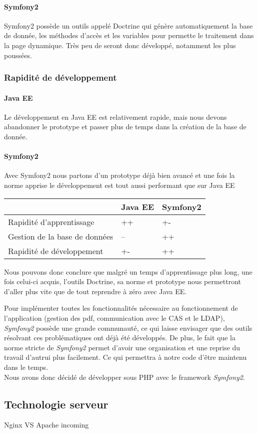 \paragraph{Symfony2}
Symfony2 possède un outils appelé Doctrine qui génère automatiquement la base de donnée, les méthodes d'accès et les variables pour permette le traitement dans la page dynamique. Très peu de seront donc développé, notamment les plus poussées.

\subsubsection{Rapidité de développement}
\paragraph{Java EE}
Le développement en Java EE est relativement rapide, mais nous devons abandonner le prototype et passer plus de temps dans la création de la base de donnée.

\paragraph{Symfony2}
Avec Symfony2 nous partons d'un prototype déjà bien avancé et une fois la norme apprise le développement est tout aussi performant que sur Java EE


\begin{tabular}{|m{125pt}|m{150pt}|m{150pt}|}
	\hline
	\null & \textbf{Java EE} & \textbf{Symfony2} \\
	\hline
	Rapidité d'apprentissage & ++ & +-\\
	\hline
	Gestion de la base de données & -- & ++\\
	\hline
	Rapidité de développement & +- & ++ \\
	\hline
\end{tabular} \vspace*{5mm}

Nous pouvons donc conclure que malgré un temps d'apprentissage plus long, une fois celui-ci acquis, l'outils Doctrine, sa norme et prototype nous permettront d'aller plus vite que de tout reprendre à zéro avec Java EE.

Pour implémenter toutes les fonctionnalités nécessaire au fonctionnement de l'application (gestion des pdf, communication avec le CAS et le LDAP), \textit{Symfony2} possède une grande communauté, ce qui laisse envisager que des outils résolvant ces problématiques ont déjà été développés.
De plus, le fait que la norme stricte de \textit{Symfony2} permet d'avoir une organisation et une reprise du travail d'autrui plus facilement. Ce qui permettra à notre code d'être maintenu dans le temps.\\

Nous avons donc décidé de développer sous PHP avec le framework \textit{Symfony2}.

\subsection{Technologie serveur}

Nginx VS Apache incoming